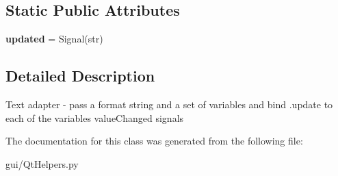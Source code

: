 \subsection*{Static Public Attributes}
\begin{DoxyCompactItemize}
\item 
\mbox{\label{classgui_1_1_qt_helpers_1_1_q_text_adapter_a2e8f2c0188789515753ff11aafbd4eaf}} 
{\bfseries updated} = Signal(str)
\end{DoxyCompactItemize}


\subsection{Detailed Description}
\begin{DoxyVerb}Text adapter - pass a format string and a set of variables and bind .update to each of the variables
    valueChanged signals \end{DoxyVerb}
 

The documentation for this class was generated from the following file\+:\begin{DoxyCompactItemize}
\item 
gui/Qt\+Helpers.\+py\end{DoxyCompactItemize}
